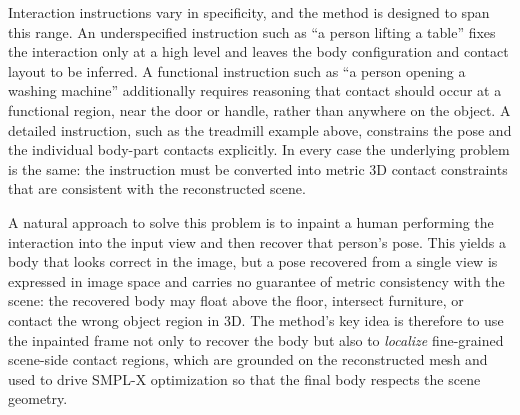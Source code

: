 Interaction instructions vary in specificity, and the method is designed to span this range. An underspecified instruction such as ``a person lifting a table'' fixes the interaction only at a high level and leaves the body configuration and contact layout to be inferred. A functional instruction such as ``a person opening a washing machine'' additionally requires reasoning that contact should occur at a functional region, near the door or handle, rather than anywhere on the object. A detailed instruction, such as the treadmill example above, constrains the pose and the individual body-part contacts explicitly. In every case the underlying problem is the same: the instruction must be converted into metric 3D contact constraints that are consistent with the reconstructed scene.

A natural approach to solve this problem is to inpaint a human performing the interaction into the input view and then recover that person's pose. This yields a body that looks correct in the image, but a pose recovered from a single view is expressed in image space and carries no guarantee of metric consistency with the scene: the recovered body may float above the floor, intersect furniture, or contact the wrong object region in 3D. The method's key idea is therefore to use the inpainted frame not only to recover the body but also to \emph{localize} fine-grained scene-side contact regions, which are grounded on the reconstructed mesh and used to drive SMPL-X optimization so that the final body respects the scene geometry.

